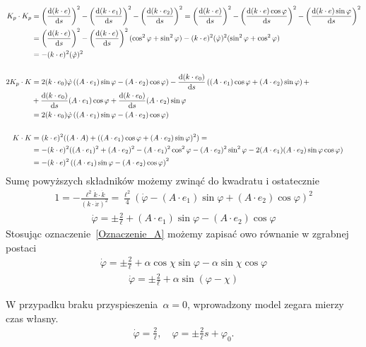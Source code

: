 \begin{align*}
K_p\cdot K_p &= \left(  \frac{\text{d} (k\cdot e)}{\text{d} s} \right)^2 
		- \left( \frac{\text{d} (k\cdot e_1)}{\text{d} s} \right)^2 
		- \left( \frac{\text{d} (k\cdot e_2)}{\text{d} s} \right)^2 
		= \left(  \frac{\text{d} (k\cdot e)}{\text{d} s} \right)^2 
		- \left( \frac{\text{d} (k\cdot e)\cos\varphi}{\text{d} s} \right)^2 
		- \left( \frac{\text{d} (k\cdot e)\sin\varphi}{\text{d} s} \right)^2 
	\\ &= \left(  \frac{\text{d} (k\cdot e)}{\text{d} s} \right)^2 
		- \left( \frac{\text{d} (k\cdot e)}{\text{d} s} 
            \right)^2 (\cos^2\varphi + \sin^2\varphi)
		- (k\cdot e)^2  (\dot{\varphi} )^2 (\sin^2\varphi + \cos^2\varphi) 
	\\ &= - (k\cdot e)^2  (\dot{\varphi} )^2 
	\\
	\\
2K_p\cdot K &= 2(k\cdot e_0 ) \dot{\varphi} \left( (A\cdot e_1) 
                \sin\varphi -(A\cdot e_2) \cos\varphi \right) 
        -\frac{\text{d}(k\cdot e_0)}{\text{d} s} \left((A\cdot e_1)\cos\varphi + 
                (A\cdot e_2) \sin\varphi \right)+
    \\ &+\frac{\text{d}(k\cdot e_0)}{\text{d} s} (A\cdot e_1)\cos\varphi 
        +\frac{\text{d}(k\cdot e_0)}{\text{d} s} (A\cdot e_2)\sin\varphi 
    \\ &=2(k\cdot e_0 ) \dot{\varphi} \left( (A\cdot e_1) \sin\varphi -
                (A\cdot e_2) \cos\varphi \right) 
	\\
	\\
K\cdot K &= (k\cdot e)^2 ( (A\cdot A ) +( \left(A\cdot e_1\right)\cos\varphi+
                    \left(A\cdot e_2\right)\sin\varphi )^2) =
    \\   &=- (k\cdot e)^2( (A\cdot e_1 )^2 + (A\cdot e_2)^2 -
                    (A\cdot e_1)^2\cos^2\varphi - (A\cdot e_2)^2\sin^2\varphi
            - 2 (A\cdot e_1) (A\cdot e_2) \sin\varphi\cos\varphi )
    \\   &=- (k\cdot e)^2\left( (A\cdot e_1) \sin\varphi -
                    (A\cdot e_2) \cos\varphi \right)^2
\end{align*}
Sumę powyższych składników możemy zwinąć do kwadratu i ostatecznie 
\begin{align*}
1 = -\frac{\ell^2\dot{k}\cdot \dot{k}}{(k\cdot \dot{x})^2}  =
\frac{\ell^2}{4} 
( \dot{\varphi} -(A\cdot e_1) \sin\varphi +(A\cdot e_2) \cos\varphi )^2 
\end{align*}
\begin{align*}
\dot{\varphi} = \pm \frac{2}{\ell} +
(A\cdot e_1) \sin\varphi - (A\cdot e_2) \cos\varphi 
\end{align*}
Stosując oznaczenie~\ref{Oznaczenie_A} możemy zapisać owo równanie w 
zgrabnej postaci
\begin{align*}
\dot{\varphi}   =\pm \frac{2}{\ell} + \alpha \cos\chi \sin\varphi -
\alpha \sin\chi \cos\varphi  
\end{align*}
\begin{align}\label{phi_equation}
\boxed{
\dot{\varphi}   = \pm \frac{2}{\ell} +\alpha \sin ( \varphi -\chi )
}
\end{align}

W przypadku braku 
przyspieszenia~$\alpha=0$, wprowadzony model zegara mierzy czas własny.
\begin{align}
\dot{\varphi} = \frac{2}{\ell},\quad
\varphi =\pm \frac{2}{\ell} s + \varphi_0.
\end{align}
